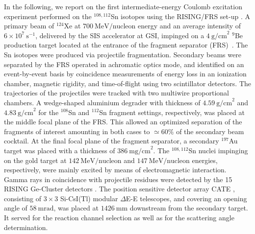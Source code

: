 \documentclass[prc,twocolumn,amssymb,amsmath,showpacs,superscriptaddress]{revtex4}
\begin{document}
In the following, we report on the first intermediate-energy
Coulomb excitation experiment performed on the $^{108,112}$Sn
isotopes using the RISING/FRS set-up \cite{wol05}. A primary beam
of $^{124}$Xe at $700\ \text{MeV/nucleon}$ energy and an average
intensity of $6 \times 10^{7}\ \text{s}^{-1}$, delivered by the
SIS accelerator at GSI, impinged on a $4\ \text{g/cm}^{2}$ $^9$Be
production target located at the entrance of the fragment
separator (FRS)~\cite{gei92}. The Sn isotopes were produced via
projectile fragmentation. Secondary beams were separated by the
FRS operated in achromatic optics mode, and identified on an
event-by-event basis by coincidence measurements of energy loss in
an ionization chamber, magnetic rigidity, and time-of-flight using
two scintillator detectors. The trajectories of the projectiles
were tracked with two multiwire proportional chambers. A
wedge-shaped aluminium degrader with thickness of $4.59\
\text{g/cm}^{2}$ and $4.83\ \text{g/cm}^{2}$ for the $^{108}$Sn
and $^{112}$Sn fragment settings, respectively, was placed at the
middle focal plane of the FRS. This allowed an optimized
separation of the fragments of interest amounting in both cases to
$\simeq 60 \%$ of the secondary beam cocktail. At the final focal
plane of the fragment separator, a secondary $^{197}$Au target was
placed with a thickness of $386\ \text{mg/cm}^{2}$. The
$^{108,112}$Sn nuclei impinging on the gold target at $142\
\text{MeV/nucleon}$ and $147\ \text{MeV/nucleon}$ energies,
respectively, were mainly excited by means of electromagnetic
interaction. Gamma rays in coincidence with projectile residues
were detected by the 15 RISING Ge-Cluster detectors
\cite{sim97,wol05}. The position sensitive detector array CATE
\cite{loz05}, consisting of $3 \times 3$ Si-CsI(Tl) modular
$\Delta$E-E telescopes, and covering an opening angle of $58\
\text{mrad}$, was placed at $1426\ \text{mm}$ downstream from the
secondary target. It served for the reaction channel selection as
well as for the scattering angle determination.
\end{document}
